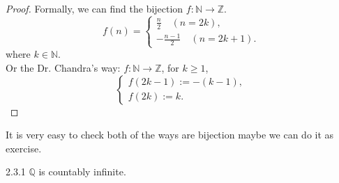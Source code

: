 \documentclass[a4paper]{article}
\def\qq{{\mathbb Q}}
\begin{document}
\begin{proof}  Formally, we can find the bijection $f:\mathbb{N}\rightarrow \mathbb{Z}$.
            \begin{equation*}
                f(n)=\begin{cases}
                    \frac{n}{2} \quad (n=2k),\\
                    -\frac{n-1}{2} \quad (n=2k+1).
                    \end{cases}
            \end{equation*}where $k \in \mathbb{N}$.\\
            Or the Dr. Chandra's way:
            $f:\mathbb{N} \rightarrow \mathbb{Z}$, for $k \geq 1$,
            \begin{equation*}
                \begin{cases}
                    f(2k-1):=-(k-1),\\
                    f(2k):=k.
                \end{cases}
            \end{equation*}
\end{proof}
            It is very easy to check both of the ways are bijection maybe we can do it as exercise.
\begin{theorem}{2.3.1}{}
    $\qq$ is countably infinite.
\end{theorem}
\end{document}
